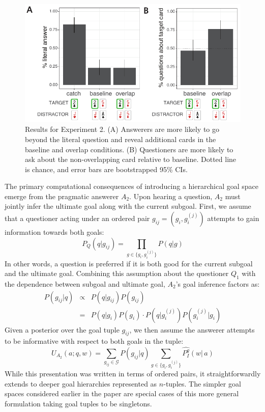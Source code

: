 \documentclass[11pt, floatsintext]{apa6}
\begin{document}
\begin{figure}[th!]
\begin{center}
\includegraphics[scale = 1]{Exp2/qualitativeResults.pdf}
\end{center}
\caption{Results for Experiment 2. (A) Answerers are more likely to go beyond the literal question and reveal additional cards in the baseline and overlap conditions. (B) Questioners are more likely to ask about the non-overlapping card relative to baseline. Dotted line is chance, and error bars are bootstrapped 95\% CIs.}
\label{fig:exp2results}
\end{figure}

The primary computational consequences of introducing a hierarchical goal space emerge from the pragmatic answerer $A_2$. 
Upon hearing a question, $A_2$ must jointly infer the ultimate goal along with the current subgoal.
First, we assume that a questioner acting under an ordered pair $g_{ij} = (g_i, g_i^{(j)})$ attempts to gain information towards both goals:
$$P_{Q}(q | g_{ij}) = \prod_{g\in \{g_i, g_i^{(j)}\}} P(q | g)$$
In other words, a question is preferred if it is both good for the current subgoal and the ultimate goal.
Combining this assumption about the questioner $Q_1$ with the dependence between subgoal and ultimate goal, $A_2$'s goal inference factors as:
$$\begin{array}{rcl}
P(g_{ij} | q) & \propto & P(q | g_{ij})P(g_{ij}) \\
 & = & P(q | g_i)P(g_i) \cdot P(q | g_i^{(j)}) P(g_i^{(j)} | g_i)
 \end{array}$$
Given a posterior over the goal tuple $g_{ij}$, we then assume the answerer attempts to be informative with respect to both goals in the tuple: 
$$U_{A_2}(a; q, w) = \sum_{g_{ij} \in \mathcal{G}} P(g_{ij}|q) \sum_{g\in \{g_i, g_i^{(j)}\}}\widehat{P^g_I}(w|\,a)$$
While this presentation was written in terms of ordered pairs, it straightforwardly extends to deeper goal hierarchies represented as $n$-tuples. 
The simpler goal spaces considered earlier in the paper are special cases of this more general formulation taking goal tuples to be singletons.
\end{document}
